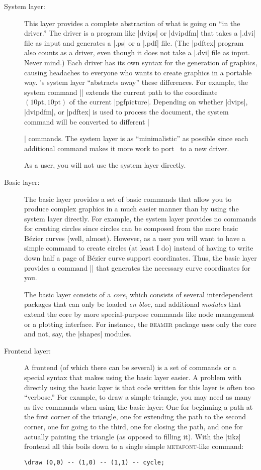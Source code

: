 \begin{description}
\item[System layer:] This layer provides a complete abstraction of what is
  going on ``in the driver.'' The driver is a program like |dvips| or
  |dvipdfm| that takes a |.dvi| file as input and generates a |.ps| or
  a |.pdf| file. (The |pdftex| program also counts as a driver, even
  though it does not take a |.dvi| file as input. Never mind.) Each
  driver has its own syntax for the generation of graphics, causing
  headaches to everyone who wants to create graphics in a portable
  way. \pgfname's system layer ``abstracts away'' these
  differences. For example, the system command
  |\pgfsys@lineto{10pt}{10pt}| extends the current path  to the coordinate
  $(10\mathrm{pt},10\mathrm{pt})$ of the current
  |{pgfpicture}|. Depending on whether |dvips|,
  |dvipdfm|, or |pdftex| is used to process the document, the system
  command will be converted to different |\special| commands.
  The system layer is as ``minimalistic'' as possible since each
  additional command makes it more work to port \pgfname\ to a new
  driver.

  As a user, you will not use the system layer directly.
\item[Basic layer:]
  The basic layer provides a set of basic commands that allow
  you to produce complex graphics in a much easier manner than by using
  the system layer directly. For example,  the system layer provides
  no commands for creating circles since circles can be composed from
  the more basic B\'ezier curves (well, almost). However, as a user you
  will want to have a simple command to create circles
  (at least I do) instead of having to write down half a page of
  B\'ezier curve support coordinates. Thus, the basic layer provides a
  command |\pgfpathcircle| that generates the necessary curve
  coordinates for you.

  The basic layer consists of a \emph{core}, which consists of
  several interdependent packages that can only be loaded \emph{en
    bloc,} and additional \emph{modules} that extend the core by more
  special-purpose commands like node management or a plotting
  interface. For instance, the \textsc{beamer} package uses only the
  core and not, say, the |shapes| modules.
\item[Frontend layer:]
  A frontend (of which there can be several) is a set of commands
  or a special syntax that makes using the basic layer easier. A
  problem with directly using the basic layer is that code written for
  this layer is often too ``verbose.'' For example, to draw a simple
  triangle, you may need as many as five commands when using the basic
  layer: One for beginning a path at the first corner of the triangle,
  one for extending the path to the second corner, one for going to
  the third, one for closing the path, and one for actually painting
  the triangle (as opposed to filling it). With the |tikz| frontend
  all this boils down to a single simple \textsc{metafont}-like
  command:
\begin{verbatim}
\draw (0,0) -- (1,0) -- (1,1) -- cycle;
\end{verbatim}


\end{description}
